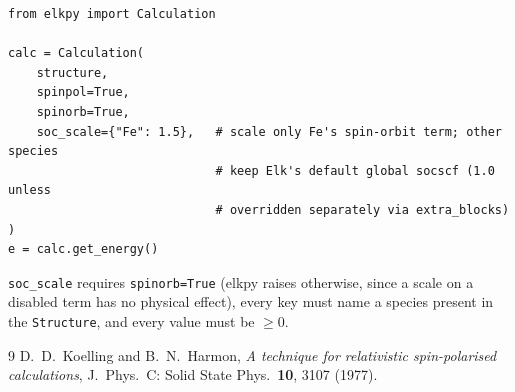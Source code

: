 \documentclass[11pt]{article}
\begin{document}
\begin{verbatim}
from elkpy import Calculation

calc = Calculation(
    structure,
    spinpol=True,
    spinorb=True,
    soc_scale={"Fe": 1.5},   # scale only Fe's spin-orbit term; other species
                             # keep Elk's default global socscf (1.0 unless
                             # overridden separately via extra_blocks)
)
e = calc.get_energy()
\end{verbatim}
\texttt{soc\_scale} requires \texttt{spinorb=True} (elkpy raises otherwise, since a
scale on a disabled term has no physical effect), every key must name a species present
in the \texttt{Structure}, and every value must be $\geq 0$.

\begin{thebibliography}{9}
D.~D.~Koelling and B.~N.~Harmon,
\emph{A technique for relativistic spin-polarised calculations},
J.\ Phys.\ C: Solid State Phys.\ \textbf{10}, 3107 (1977).
\end{thebibliography}
\end{document}
